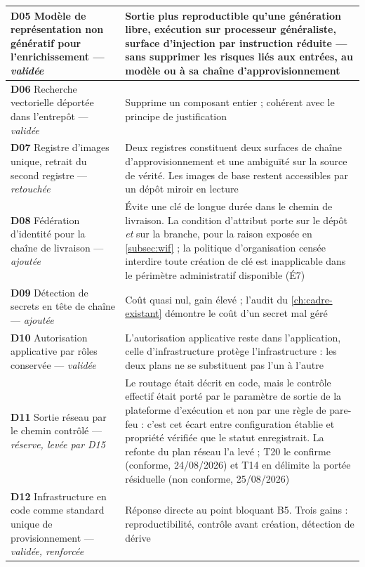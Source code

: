 \begin{longtable}{|P{3.2cm}|P{12.1cm}|}
\textbf{D05} Modèle de représentation non génératif pour l'enrichissement --- \emph{validée} &
Sortie plus reproductible qu'une génération libre, exécution sur processeur généraliste, surface
d'injection par instruction réduite --- sans supprimer les risques liés aux entrées, au modèle ou à
sa chaîne d'approvisionnement \\ \hline
\textbf{D06} Recherche vectorielle déportée dans l'entrepôt --- \emph{validée} &
Supprime un composant entier ; cohérent avec le principe de justification \\ \hline
\textbf{D07} Registre d'images unique, retrait du second registre --- \emph{retouchée} &
Deux registres constituent deux surfaces de chaîne d'approvisionnement et une ambiguïté sur la
source de vérité. Les images de base restent accessibles par un dépôt miroir en lecture \\ \hline
\textbf{D08} Fédération d'identité pour la chaîne de livraison --- \emph{ajoutée} &
Évite une clé de longue durée dans le chemin de livraison. La condition d'attribut porte sur le
dépôt \emph{et} sur la branche, pour la raison exposée en \cref{subsec:wif} ; la politique
d'organisation censée interdire toute création de clé est inapplicable dans le périmètre
administratif disponible (É7) \\ \hline
\textbf{D09} Détection de secrets en tête de chaîne --- \emph{ajoutée} &
Coût quasi nul, gain élevé ; l'audit du \cref{ch:cadre-existant} démontre le coût d'un
secret mal géré \\ \hline
\textbf{D10} Autorisation applicative par rôles conservée --- \emph{validée} &
L'autorisation applicative reste dans l'application, celle d'infrastructure protège
l'infrastructure : les deux plans ne se substituent pas l'un à l'autre \\ \hline
\textbf{D11} Sortie réseau par le chemin contrôlé --- \emph{réserve, levée par D15} &
Le routage était décrit en code, mais le contrôle effectif était porté par le paramètre de sortie
de la plateforme d'exécution et non par une règle de pare-feu : c'est cet écart entre configuration
établie et propriété vérifiée que le statut enregistrait. La refonte du plan réseau l'a levé ; T20
le confirme (conforme, 24/08/2026) et T14 en délimite la portée résiduelle (non conforme,
25/08/2026) \\ \hline
\textbf{D12} Infrastructure en code comme standard unique de provisionnement ---
\emph{validée, renforcée} &
Réponse directe au point bloquant B5. Trois gains : reproductibilité, contrôle avant création,
détection de dérive \\ \hline

\end{longtable}
